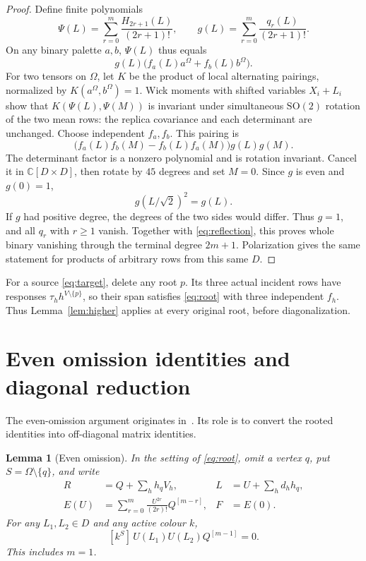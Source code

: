 \documentclass[11pt]{article}
\newtheorem{lemma}[theorem]{Lemma}
\theoremstyle{definition}
\theoremstyle{plain}
\numberwithin{equation}{section}
\begin{document}
\begin{proof}
Define finite polynomials
\[
 \Psi(L)=\sum_{r=0}^m\frac{H_{2r+1}(L)}{(2r+1)!},
 \qquad
 g(L)=\sum_{r=0}^m\frac{q_r(L)}{(2r+1)!}.
\]
On any binary palette \(a,b\), \(\Psi(L)\) thus equals
\[
 g(L)\bigl(f_a(L)a^\Omega+f_b(L)b^\Omega\bigr).
\]
For two tensors on \(\Omega\), let \(K\) be the product of local alternating
pairings, normalized by \(K(a^\Omega,b^\Omega)=1\). Wick moments with shifted
variables \(X_i+L_i\) show that \(K(\Psi(L),\Psi(M))\) is invariant under
simultaneous \(\mathrm{SO}(2)\) rotation of the two mean rows: the replica
covariance and each determinant are unchanged. Choose independent
\(f_a,f_b\). This pairing is
\[
 \bigl(f_a(L)f_b(M)-f_b(L)f_a(M)\bigr)g(L)g(M).
\]
The determinant factor is a nonzero polynomial and is rotation invariant.
Cancel it in \(\mathbb C[D\times D]\), then rotate by \(45\) degrees and set
\(M=0\). Since \(g\) is even and \(g(0)=1\),
\[
 g(L/\sqrt2)^2=g(L).
\]
If \(g\) had positive degree, the degrees of the two sides would differ.
Thus \(g=1\), and all \(q_r\) with \(r\ge1\) vanish. Together with
\eqref{eq:reflection}, this proves whole binary vanishing through the
terminal degree \(2m+1\). Polarization gives the same statement for products
of arbitrary rows from this same \(D\).
\end{proof}

For a source \eqref{eq:target}, delete any root \(p\). Its three actual
incident rows have responses \(\tau_hh^{V\setminus\{p\}}\), so their span
satisfies \eqref{eq:root} with three independent \(f_h\). Thus
Lemma~\ref{lem:higher} applies at every original root, before diagonalization.

\section{Even omission identities and diagonal reduction}\label{sec:diagonal}

The even-omission argument originates in~\cite{omission}. Its role is to
convert the rooted identities into off-diagonal matrix identities.

\begin{lemma}[Even omission]\label{lem:omission}
In the setting of \eqref{eq:root}, omit a vertex \(q\), put
\(S=\Omega\setminus\{q\}\), and write
\[
 \begin{aligned}
 R&=Q+\sum_h h_q V_h,& L&=U+\sum_h d_hh_q,\\
 E(U)&=\sum_{r=0}^m\frac{U^{2r}}{(2r)!}Q^{[m-r]},&F&=E(0).
 \end{aligned}
\]
For any \(L_1,L_2\in D\) and any active colour \(k\),
\[
 [k^S]\,U(L_1)U(L_2)Q^{[m-1]}=0.
\]
This includes \(m=1\).
\end{lemma}
\end{document}
